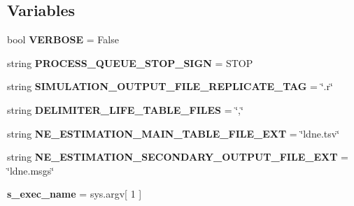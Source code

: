 \subsection*{Variables}
\begin{DoxyCompactItemize}
\item 
bool {\bfseries V\+E\+R\+B\+O\+SE} = False\hypertarget{namespacenegui_1_1pgutilities_a274572b1b2788c24df3e269bc2a3f1f7}{}\label{namespacenegui_1_1pgutilities_a274572b1b2788c24df3e269bc2a3f1f7}

\item 
string {\bfseries P\+R\+O\+C\+E\+S\+S\+\_\+\+Q\+U\+E\+U\+E\+\_\+\+S\+T\+O\+P\+\_\+\+S\+I\+GN} = \textquotesingle{}S\+T\+OP\textquotesingle{}\hypertarget{namespacenegui_1_1pgutilities_aed436e1fc2eb29963ea30b17e614fd04}{}\label{namespacenegui_1_1pgutilities_aed436e1fc2eb29963ea30b17e614fd04}

\item 
string {\bfseries S\+I\+M\+U\+L\+A\+T\+I\+O\+N\+\_\+\+O\+U\+T\+P\+U\+T\+\_\+\+F\+I\+L\+E\+\_\+\+R\+E\+P\+L\+I\+C\+A\+T\+E\+\_\+\+T\+AG} = \char`\"{}.r\char`\"{}\hypertarget{namespacenegui_1_1pgutilities_aeca2401751f6dc9cd4acbe9765271e20}{}\label{namespacenegui_1_1pgutilities_aeca2401751f6dc9cd4acbe9765271e20}

\item 
string {\bfseries D\+E\+L\+I\+M\+I\+T\+E\+R\+\_\+\+L\+I\+F\+E\+\_\+\+T\+A\+B\+L\+E\+\_\+\+F\+I\+L\+ES} = \char`\"{},\char`\"{}\hypertarget{namespacenegui_1_1pgutilities_ad2dc8f53cd27db093fc7f1227367d833}{}\label{namespacenegui_1_1pgutilities_ad2dc8f53cd27db093fc7f1227367d833}

\item 
string {\bfseries N\+E\+\_\+\+E\+S\+T\+I\+M\+A\+T\+I\+O\+N\+\_\+\+M\+A\+I\+N\+\_\+\+T\+A\+B\+L\+E\+\_\+\+F\+I\+L\+E\+\_\+\+E\+XT} = \char`\"{}ldne.\+tsv\char`\"{}\hypertarget{namespacenegui_1_1pgutilities_aa78d8e8004985b127644b8c985a2b551}{}\label{namespacenegui_1_1pgutilities_aa78d8e8004985b127644b8c985a2b551}

\item 
string {\bfseries N\+E\+\_\+\+E\+S\+T\+I\+M\+A\+T\+I\+O\+N\+\_\+\+S\+E\+C\+O\+N\+D\+A\+R\+Y\+\_\+\+O\+U\+T\+P\+U\+T\+\_\+\+F\+I\+L\+E\+\_\+\+E\+XT} = \char`\"{}ldne.\+msgs\char`\"{}\hypertarget{namespacenegui_1_1pgutilities_adfda5d480a10cf273a287871a5aba972}{}\label{namespacenegui_1_1pgutilities_adfda5d480a10cf273a287871a5aba972}

\item 
{\bfseries s\+\_\+exec\+\_\+name} = sys.\+argv\mbox{[} 1 \mbox{]}\hypertarget{namespacenegui_1_1pgutilities_a25b185def2c6bb2698b1927b4a20a904}{}\label{namespacenegui_1_1pgutilities_a25b185def2c6bb2698b1927b4a20a904}

\end{DoxyCompactItemize}


